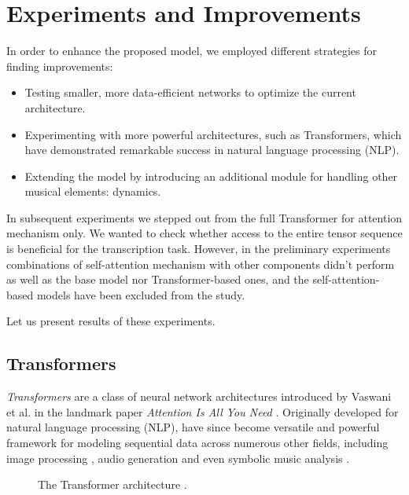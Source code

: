 \chapter{Experiments and Improvements}\label{experiments_and_improvements}

In order to enhance the proposed model, we employed different strategies for finding improvements: \begin{itemize}
	\item Testing smaller, more data-efficient networks to optimize the current architecture.
	\item Experimenting with more powerful architectures, such as Transformers, which have demonstrated remarkable success in natural language processing (NLP).
	\item Extending the model by introducing an additional module for handling other musical elements: dynamics. \end{itemize}
	
In subsequent experiments we stepped out from the full Transformer for attention mechanism only. We wanted to check whether access to the entire tensor sequence is beneficial for the transcription task. However, in the preliminary experiments combinations of self-attention mechanism with other components didn't perform as well as the base model nor Transformer-based ones, and the self-attention-based models have been excluded from the study.
	
Let us present results of these experiments.

\section{Transformers}

\emph{Transformers} are a class of neural network architectures introduced by Vaswani et al. in the landmark paper \emph{Attention Is All You Need} \cite{Vaswani2017}. Originally developed for natural language processing (NLP), have since become versatile and powerful framework for modeling sequential data across numerous other fields, including image processing \cite{Dosovitskiy2020}, audio generation \cite{Borsos2023} and even symbolic music analysis \cite{Zhu2021}.

\begin{figure}[ht!]
\centering

\caption[The Transformer architecture.]{The Transformer architecture \cite{Vaswani2017}.}
\end{figure}

